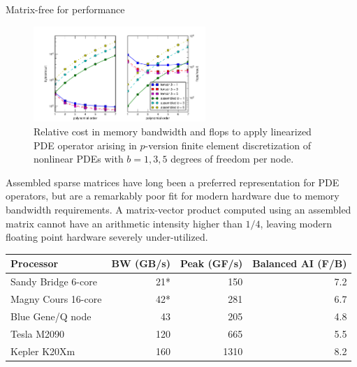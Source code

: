 \documentclass[final,t]{beamer}
\begin{document}
\begin{frame}{}
\begin{columns}
\begin{column}{0.31\textwidth}
\begin{block}{Matrix-free for performance}
        \begin{figure}
          \includegraphics[width=0.58\textwidth]{figures/TensorVsAssembly}
          \caption{Relative cost in memory bandwidth and flops to apply
            linearized PDE operator arising in $p$-version finite
            element discretization of nonlinear PDEs with $b=1,3,5$
            degrees of freedom per node.}\label{fig:TensorVsAssembly}
        \end{figure}
        Assembled sparse matrices have long been a preferred representation for PDE operators, but are a remarkably poor fit for modern hardware due to memory bandwidth requirements.
        A matrix-vector product computed using an assembled matrix cannot have an arithmetic intensity higher than $1/4$, leaving modern floating point hardware severely under-utilized.
        \begin{table}
          \centering
          \begin{tabular}{lrrr}
            \toprule
            Processor           & BW (GB/s) & Peak (GF/s) & Balanced AI (F/B) \\
            \midrule
            Sandy Bridge 6-core & 21*       & 150         & 7.2                 \\
            Magny Cours 16-core & 42*       & 281         & 6.7                 \\
            Blue Gene/Q node    & 43        & 205         & 4.8                 \\
            Tesla M2090         & 120  & 665  & 5.5 \\
            Kepler K20Xm        & 160 & 1310 & 8.2 \\ %
            \bottomrule
          \end{tabular}

\end{table}
\end{block}
\end{column}
\end{columns}
\end{frame}
\end{document}
